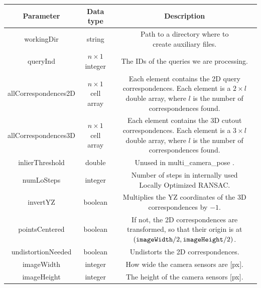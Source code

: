 \documentclass[twoside]{ctuthesis}
\theoremstyle{plain}
\theoremstyle{definition}
\theoremstyle{note}
\newcommand{\todo}[1][]{%
\ifthenelse{\isempty{#1}}{{\color{red}{TODO}}}{{\color{red}{TODO: #1}}}%
}
\newcommand{\code}[1]{{\ttfamily #1%
}}
\begin{document}
\begin{table}[htb!]
	\centering
	\footnotesize
	\begin{tabular}{|c|c|c|}
		\hline
		Parameter & Data type & Description \\
		\hline
		\hline
		\code{workingDir} & string & \makecell{Path to a directory where to \\ create auxiliary files.} \\
		\hline
		\code{queryInd} & $n \times 1$ integer & The IDs of the queries we are processing. \\
		\hline
		\code{allCorrespondences2D} & $n \times 1$ cell array & \makecell{Each element contains the \\ 2D query correspondences. \\ Each element is a $2 \times l$ double array, \\ where $l$ is the number of correspondences found.} \\
		\hline
		\code{allCorrespondences3D} & $n \times 1$ cell array & \makecell{Each element contains the \\ 3D cutout correspondences. \\ Each element is a $3 \times l$ double array, \\ where $l$ is the number of correspondences found.} \\
		\hline
		\code{inlierThreshold} & double & Unused in \code{multi\_camera\_pose}. \\
		\hline
		\code{numLoSteps} & integer & \makecell{Number of steps in internally used \\ Locally Optimized RANSAC.} \\
		\hline
		\code{invertYZ} & boolean & \makecell{Multiplies the YZ coordinates of the \\ 3D correspondences by $-1$.} \\
		\hline
		\code{pointsCentered} & boolean & \makecell{If not, the 2D correspondences are transformed, \\ so that their origin is \\ at $(\text{\code{imageWidth}}/2, \text{\code{imageHeight}}/2)$.} \\
		\hline
		\code{undistortionNeeded} & boolean & \makecell{Undistorts the 2D correspondences. \\ \todo[cite some distortion publication?]} \\
		\hline
		\code{imageWidth} & integer & How wide the camera sensors are [px]. \\
		\hline
		\code{imageHeight} & integer & The height of the camera sensors [px]. \\

\end{tabular}
\end{table}
\end{document}
